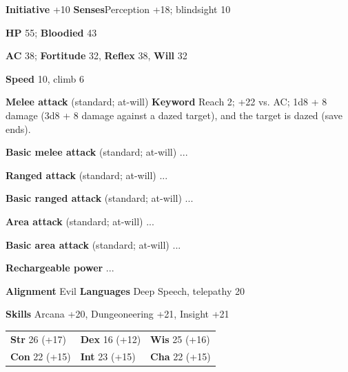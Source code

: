 \documentclass{article}
\begin{document}
\begin{monster}{}
	\textbf{Initiative} +10 \qquad \textbf{Senses}Perception +18; blindsight 10 \par
	\textbf{HP} 55; \textbf{Bloodied} 43 \par
	\textbf{AC} 38; \textbf{Fortitude} 32, \textbf{Reﬂex} 38, \textbf{Will} 32 \par
	\textbf{Speed} 10, climb 6 \par
	\begin{monsterskill}{\melee \textbf{Melee attack} (standard; at-will) \diam \textbf{Keyword}}
		Reach 2; +22 vs. AC; 1d8 + 8 damage (3d8 + 8 damage against a dazed target), and the target is dazed (save ends).
	\end{monsterskill}
	\begin{monsterskill}{\meleeBase \textbf{Basic melee attack} (standard; at-will)}
		...
	\end{monsterskill}
	\begin{monsterskill}{\ranged \textbf{Ranged attack} (standard; at-will)}
		...
	\end{monsterskill}
	\begin{monsterskill}{\rangedBase \textbf{Basic ranged attack} (standard; at-will)}
		...
	\end{monsterskill}
	\begin{monsterskill}{\area \textbf{Area attack} (standard; at-will)}
		...
	\end{monsterskill}
	\begin{monsterskill}{\areaBase \textbf{Basic area attack} (standard; at-will)}
		...
	\end{monsterskill}
	\begin{monsterskill}{\textbf{Rechargeable power} \done \dtwo \dthree \dfour \dfive \dsix}
		...
	\end{monsterskill}
	\begin{darkline}
		\textbf{Alignment} Evil \qquad \textbf{Languages} Deep Speech, telepathy 20


		\textbf{Skills} Arcana +20, Dungeoneering +21, Insight +21

		\begin{tabular}{lll}
			\textbf{Str} 26 (+17) &
			\textbf{Dex} 16 (+12) &
			\textbf{Wis} 25 (+16) \\
			\textbf{Con} 22 (+15) &
			\textbf{Int} 23 (+15) &
			\textbf{Cha} 22 (+15)
		\end{tabular}
	\end{darkline}
\end{monster}
\end{document}
